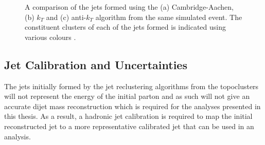 \begin{figure}[!ht]
\begin{center}
  \end{center}
  \caption[A comparison of the jets formed using the (a) Cambridge-Aachen, (b) $k_T$ and (c) anti-$k_T$ algorithm from the same simulated event.
    The constituent clusters of each of the jets formed is indicated using various colours.]
          {A comparison of the jets formed using the (a) Cambridge-Aachen, (b) $k_T$ and (c) anti-$k_T$ algorithm from the same simulated event.
            The constituent clusters of each of the jets formed is indicated using various colours \cite{obj-jets_reco_salam}.}
  \label{fig:obj-jets_reco_shapes}
\end{figure}

\subsection{Jet Calibration and Uncertainties}
\label{sec:obj-jets_calib}

The jets initially formed by the jet reclustering algorithms from the topoclusters
will not represent the energy of the initial parton
and as such will not give an accurate dijet mass reconstruction which is required for the analyses presented in this thesis.
As a result, a hadronic jet calibration is required to map the initial reconstructed jet
to a more representative calibrated jet that can be used in an analysis.

